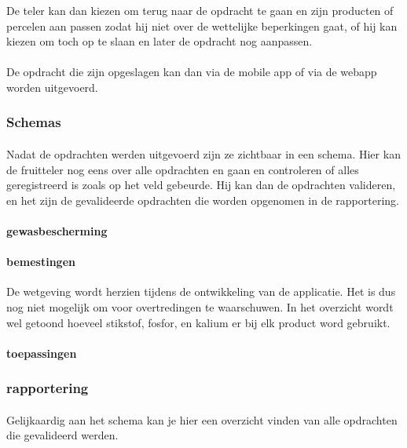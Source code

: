 De teler kan dan kiezen om terug naar de opdracht te gaan en zijn producten of percelen
aan passen zodat hij niet over de wettelijke beperkingen gaat, of hij kan kiezen om toch
op te slaan en later de opdracht nog aanpassen.

\paragraph {} De opdracht die zijn opgeslagen kan dan via de mobile app of via de webapp
worden uitgevoerd.


\subsubsection {Schemas}

\paragraph {} Nadat de opdrachten werden uitgevoerd zijn ze zichtbaar in een schema. Hier
kan de fruitteler nog eens over alle opdrachten en gaan en controleren of alles
geregistreerd is zoals op het veld gebeurde. Hij kan dan de opdrachten valideren, en het
zijn de gevalideerde opdrachten die worden opgenomen in de rapportering.

\paragraph {gewasbescherming}

\paragraph {bemestingen} De wetgeving wordt herzien tijdens de ontwikkeling van de
applicatie. Het is dus nog niet mogelijk om voor overtredingen te waarschuwen. In het
overzicht wordt wel getoond hoeveel stikstof, fosfor, en kalium er bij elk product word
gebruikt.

\paragraph {toepassingen}


\subsubsection {rapportering}\label{rapportering}

\paragraph {} Gelijkaardig aan het schema kan je hier een overzicht vinden van alle
opdrachten die gevalideerd werden.


